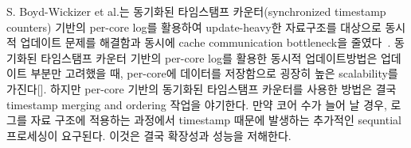 \ifkor
S. Boyd-Wickizer et al.는 동기화된 타임스탬프 카운터(synchronized timestamp counters) 기반의
per-core log를 활용하여 update-heavy한 자료구조를 대상으로 동시적 업데이트 문제를
해결함과 동시에 cache communication bottleneck을 줄였다~\cite{SilasBoydWickizerPth}.
동기화된 타임스탬프 카운터 기반의 per-core log를 활용한 동시적 업데이트방법은
업데이트 부분만 고려했을 때, per-core에 데이터를 저장함으로 굉장히 높은 scalability를 가진다[].
하지만 per-core 기반의 동기화된 타임스탬프 카운터를 사용한 방법은 결국 timestamp merging and ordering 작업을
야기한다.
만약 코어 수가 늘어 날 경우, 로그를 자료 구조에 적용하는 과정에서 timestamp 때문에 발생하는 추가적인 sequntial 프로세싱이
요구된다.
이것은 결국 확장성과 성능을 저해한다. 
\else
\fi



